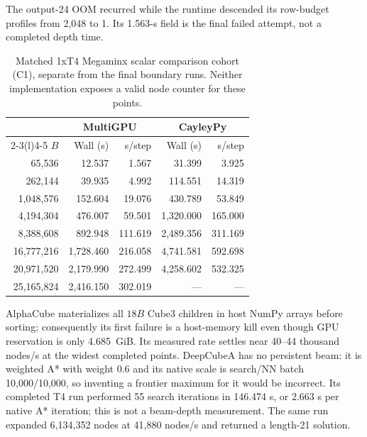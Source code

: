 \documentclass[10pt,twocolumn]{article}
\begin{document}
The output-24 OOM recurred while the runtime descended its row-budget profiles
from 2,048 to 1. Its 1.563-s field is the final failed attempt, not a completed
depth time.

\begin{table}[t]
\centering
\small
\setlength{\tabcolsep}{2pt}
\caption{Matched 1xT4 Megaminx scalar comparison cohort (C1), separate from the
final boundary runs. Neither implementation exposes a valid node counter for
these points.}
\label{tab:megaminx_curve}
\begin{tabular}{@{}rrrrr@{}}
\toprule
& \multicolumn{2}{c}{MultiGPU} & \multicolumn{2}{c}{CayleyPy} \\
\cmidrule(lr){2-3}\cmidrule(l){4-5}
$B$ & Wall (s) & s/step & Wall (s) & s/step \\
\midrule
65,536     & 12.537    & 1.567   & 31.399    & 3.925 \\
262,144    & 39.935    & 4.992   & 114.551   & 14.319 \\
1,048,576  & 152.604   & 19.076  & 430.789   & 53.849 \\
4,194,304  & 476.007   & 59.501  & 1,320.000 & 165.000 \\
8,388,608  & 892.948   & 111.619 & 2,489.356 & 311.169 \\
16,777,216 & 1,728.460 & 216.058 & 4,741.581 & 592.698 \\
20,971,520 & 2,179.990 & 272.499 & 4,258.602 & 532.325 \\
25,165,824 & 2,416.150 & 302.019 & ---       & --- \\
\bottomrule
\end{tabular}
\end{table}

AlphaCube materializes all $18B$ Cube3 children in host NumPy arrays before
sorting; consequently its first failure is a host-memory kill even though GPU
reservation is only 4.685~GiB.  Its measured rate settles near 40--44 thousand
nodes/s at the widest completed points.  DeepCubeA has no persistent beam: it
is weighted A* with weight $0.6$ and its native scale is search/NN batch
10,000/10,000, so
inventing a frontier maximum for it would be incorrect.  Its completed T4 run
performed 55 search iterations in 146.474 s, or 2.663 s per native A* iteration;
this is not a beam-depth measurement.  The same run expanded 6,134,352 nodes
at 41,880 nodes/s and returned a length-21 solution.
\end{document}
